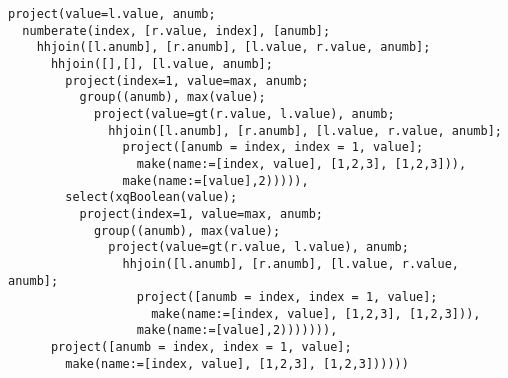 \begin{Verbatim}
project(value=l.value, anumb;
  numberate(index, [r.value, index], [anumb];
    hhjoin([l.anumb], [r.anumb], [l.value, r.value, anumb];
      hhjoin([],[], [l.value, anumb];
        project(index=1, value=max, anumb;
          group((anumb), max(value);
            project(value=gt(r.value, l.value), anumb;
              hhjoin([l.anumb], [r.anumb], [l.value, r.value, anumb];
                project([anumb = index, index = 1, value];
                  make(name:=[index, value], [1,2,3], [1,2,3])),
                make(name:=[value],2))))),
        select(xqBoolean(value);
          project(index=1, value=max, anumb;
            group((anumb), max(value);
              project(value=gt(r.value, l.value), anumb;
                hhjoin([l.anumb], [r.anumb], [l.value, r.value, anumb];
                  project([anumb = index, index = 1, value];
                    make(name:=[index, value], [1,2,3], [1,2,3])),
                  make(name:=[value],2))))))),
      project([anumb = index, index = 1, value];
        make(name:=[index, value], [1,2,3], [1,2,3])))))
\end{Verbatim}
